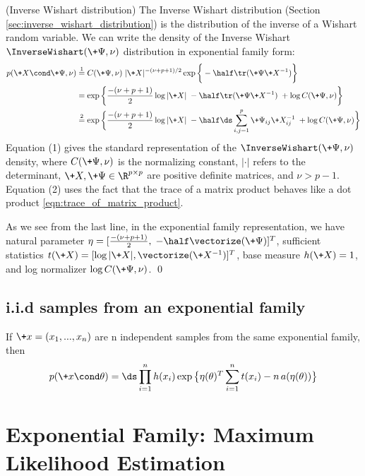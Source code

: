 \documentclass{article} %
\begin{document}
\begin{example}{(Inverse Wishart distribution)} 
\label{ex:inverse_wishart_as_ef} The Inverse Wishart distribution (Section \ref{sec:inverse_wishart_distribution}) is the distribution of the inverse of a Wishart random variable.   We can write the density of the Inverse Wishart $\InverseWishart(\+\Psi,  \nu)$ distribution in exponential family form:
\begin{align*}
p (\+X  \cond \+\Psi,  \nu) & \stackrel{1}{=} C(\+\Psi,  \nu) \; | \+X | ^{-(\nu + p + 1)/2} \exp \bigg\{ -\half \tr (\+\Psi \+X^{-1} ) \bigg\} \\
& = \exp \bigg\{ \frac{-(\nu + p + 1)}{2}  \log | \+ X | \;  -\half \tr (\+\Psi \+X^{-1} )  \; + \log  C(\+\Psi,  \nu)   \bigg\} \\
& \stackrel{2}{=} \exp \bigg\{ \frac{-(\nu + p + 1)}{2}  \log | \+ X | \;  -\half  \ds\sum_{i,j=1}^p \+\Psi_{ij} \+X^{-1}_{ij} \; + \log  C(\+\Psi,  \nu)   \bigg\} 
\end{align*}
Equation (1) gives the standard representation of the $\InverseWishart(\+\Psi,  \nu)$ density,  where   $C(\+\Psi,  \nu)$ is the normalizing constant,  $| \cdot |$ refers to the determinant,  $\+X,  \+\Psi \in \R^{p \times p}$ are positive definite matrices,  and $\nu > p-1$.    Equation (2) uses the fact that the trace of a matrix product behaves like a dot product \eqref{eqn:trace_of_matrix_product}.      


As we see from the last line,  in the exponential family representation,  we have natural parameter $\eta = [\frac{-(\nu + p + 1)}{2},  \; -\half \vectorize (\+\Psi)]^T$, sufficient statistics $t(\+X) = [\log | \+X | , \vectorize (\+X^{-1})]^T$, base measure $h(\+X)=1$, and log normalizer $ \log  C(\+\Psi,  \nu)$.   
\qed 
\end{example} 


\subsection{i.i.d samples from an exponential family}
If $\+x=(x_1, ..., x_n)$ are n independent samples from the same exponential family, then 
\begin{align}
\label{eqn:exponential_family_iid}
 p(\+x \cond \theta) = \ds\prod_{i=1}^n h(x_i) \exp \big\{ \eta(\theta)^T \sum_{i=1}^n t(x_i) - n \,a(\eta(\theta))\big\} 
 \end{align}

\section{Exponential Family: Maximum Likelihood Estimation} \label{sec:ml_with_ef}
\end{document}
